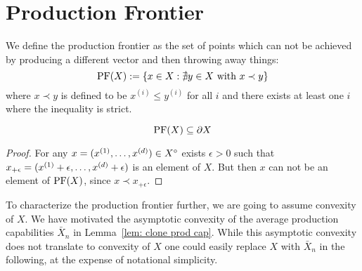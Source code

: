 \section{Production Frontier}

We define the production frontier as the set of points which can not be
achieved by producing a different vector and then throwing away things:
\[
	\operatorname{PF}(X) := \{ x\in X : \nexists y\in X \text{ with } x\prec y\}
\]
where \(x\prec y\) is defined to be \(x^{(i)} \le y^{(i)}\) for all \(i\) and
there exists at least one \(i\) where the inequality is strict.

\begin{lemma}
	\label{lem: prod frontier part of boundary}
	\[
		\operatorname{PF}(X)\subseteq \partial X
	\]
\end{lemma}
\begin{proof}
	For any \(x=(x^{(1)},\dots, x^{(d)})\in X^\circ\) exists \(\epsilon>0\)
	such that \(x_{+\epsilon} = (x^{(1)}+\epsilon, \dots, x^{(d)}+\epsilon)\)
	is an element of \(X\). But then \(x\) can not be an element of \(\operatorname{PF}(X)\),
	since \(x \prec x_{+\epsilon}\).
\end{proof}

To characterize the production frontier further, we are going to assume
convexity of \(X\). We have motivated the asymptotic convexity of the
average production capabilities \(\bar{X}_n\) in Lemma~\ref{lem: clone prod
cap}. While this asymptotic convexity does not translate to convexity of \(X\)
one could easily replace \(X\) with \(\bar{X}_n\) in the following, at the
expense of notational simplicity.

